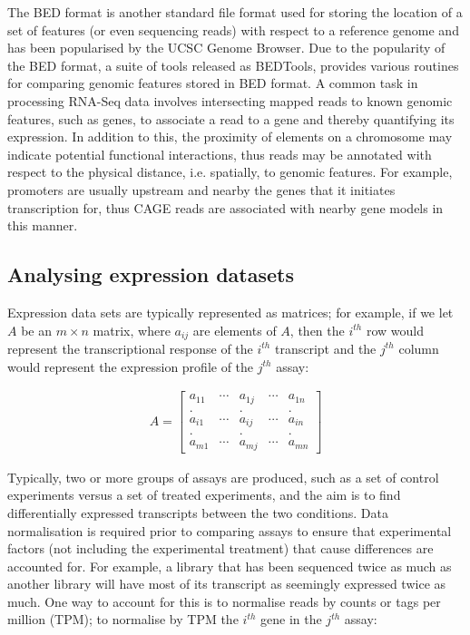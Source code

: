 The BED format\cite{bedformat} is another standard file format used for storing the location of a set of features (or even sequencing reads) with respect to a reference genome and has been popularised by the UCSC Genome Browser\cite{Kent01062002}. Due to the popularity of the BED format, a suite of tools released as BEDTools\cite{pmid20110278}, provides various routines for comparing genomic features stored in BED format. A common task in processing RNA-Seq data involves intersecting mapped reads to known genomic features, such as genes, to associate a read to a gene and thereby quantifying its expression. In addition to this, the proximity of elements on a chromosome may indicate potential functional interactions, thus reads may be annotated with respect to the physical distance, i.e. spatially, to genomic features. For example, promoters are usually upstream and nearby the genes that it initiates transcription for, thus CAGE reads are associated with nearby gene models in this manner.

\subsection{Analysing expression datasets}

Expression data sets are typically represented as matrices; for example, if we let $A$ be an $m \times n$ matrix, where $a_{ij}$ are elements of $A$, then the $i^{th}$ row would represent the transcriptional response of the $i^{th}$ transcript and the $j^{th}$ column would represent the expression profile of the $j^{th}$ assay:

\begin{align*}
   A = \begin{bmatrix} a_{11} & \cdots & a_{1j} & \cdots & a_{1n} \\
   . && . && . \\
   a_{i1} & \cdots & a_{ij} & \cdots & a_{in} \\
   . && . && . \\
   a_{m1} & \cdots & a_{mj} & \cdots & a_{mn} \end{bmatrix}
\end{align*}

Typically, two or more groups of assays are produced, such as a set of control experiments versus a set of treated experiments, and the aim is to find differentially expressed transcripts between the two conditions. Data normalisation is required prior to comparing assays to ensure that experimental factors (not including the experimental treatment) that cause differences are accounted for. For example, a library that has been sequenced twice as much as another library will have most of its transcript as seemingly expressed twice as much. One way to account for this is to normalise reads by counts or tags per million (TPM); to normalise by TPM the $i^{th}$ gene in the $j^{th}$ assay:


